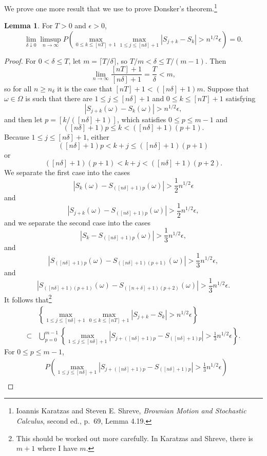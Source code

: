 \documentclass{article}
\theoremstyle{definition}
\newtheorem{lemma}[theorem]{Lemma}
\theoremstyle{definition}
\begin{document}
We prove one more result that we use to prove Donsker's theorem.\footnote{Ioannis Karatzas and Steven E. Shreve,
{\em Brownian Motion and Stochastic Calculus}, second ed., p.~69, Lemma 4.19.}

\begin{lemma}
For $T>0$ and $\epsilon>0$,
\[
\lim_{\delta \downarrow 0} \limsup_{n \to \infty} P\left( \max_{0 \leq k \leq [nT]+1}
\max_{1 \leq j \leq [n\delta]+1} |S_{j+k}-S_k| > n^{1/2} \epsilon \right) = 0.
\]
\label{lemma419}
\end{lemma}
\begin{proof}
For $0<\delta \leq T$, let $m = \lceil T/\delta \rceil$, so $T/m < \delta \leq T/(m-1)$. 
Then
\[
\lim_{n \to \infty} \frac{[nT]+1}{[n\delta]+1} = \frac{T}{\delta}<m,
\]
so for all $n \geq n_\delta$ it is the case that $[nT]+1 < ([n\delta]+1)m$. 
Suppose that $\omega \in \Omega$ is such that there are
$1 \leq j \leq [n\delta]+1$
and $0 \leq k \leq [nT]+1$ satisfying
\[
|S_{j+k}(\omega) - S_k(\omega)| > n^{1/2} \epsilon,
\]
 and  then let  $p=[k/([n\delta]+1)]$,
which satisfies
$0 \leq p \leq m-1$ and
\[
([n\delta]+1)p \leq k < ([n\delta]+1)(p+1).
\]
Because $1 \leq j \leq [n\delta]+1$, either
\[
([n\delta]+1)p < k+j \leq ([n\delta]+1)(p+1)
\]
or
\[
([n\delta]+1)(p+1) < k+j < ([n\delta]+1)(p+2).
\]
We separate the first case into the cases
\[
|S_k(\omega)-S_{([n\delta]+1)p}(\omega)| > \frac{1}{2}n^{1/2} \epsilon
\]
and
 \[
 |S_{j+k}(\omega) - S_{([n\delta]+1)p}(\omega)| > \frac{1}{2}n^{1/2}\epsilon,
 \]
and we separate the second case into the cases 
\[
|S_k-S_{([n\delta]+1)p}(\omega)| > \frac{1}{3}n^{1/2} \epsilon,
\]
and
\[ 
|S_{([n\delta]+1)p}(\omega) - S_{([n\delta]+1)(p+1)}(\omega)| > \frac{1}{3}n^{1/2} \epsilon,
\]
 and
\[
|S_{([n\delta]+1)(p+1)}(\omega) - S_{([n+\delta]+1)(p+2)}(\omega)| > \frac{1}{3}n^{1/2} \epsilon.
\] 
It follows that\footnote{This should be worked out more carefully. In Karatzas and Shreve, there is $m+1$ where I have $m$.}
\[
\begin{split}
&\left\{ \max_{1 \leq j \leq [n\delta]+1} \max_{0 \leq k \leq [nT]+1} |S_{j+k}-S_k| > n^{1/2} \epsilon\right\}\\
\subset&\bigcup_{p=0}^{m-1} \left\{ \max_{1 \leq j \leq [n\delta]+1} |S_{j+([n\delta]+1)p}-S_{([n\delta]+1)p}| > \frac{1}{3}n^{1/2}\epsilon\right\}.
\end{split}
\]
For $0 \leq p \leq m-1$,
\[
\begin{split}
&P\left( \max_{1 \leq j \leq [n\delta]+1} |S_{j+([n\delta]+1)p} - S_{([n\delta]+1)p}| > \frac{1}{3}n^{1/2}\epsilon\right)\\

\end{split}\]
\end{proof}
\end{document}
